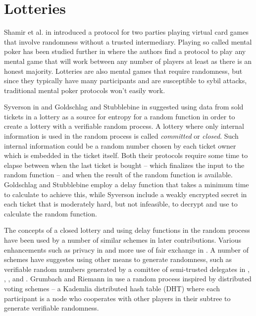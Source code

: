 \section{Lotteries}
\label{sec:lotteries}


Shamir et al. in \cite{shamir_mental_1981} introduced a protocol for two parties playing virtual card games that involve randomness without a trusted intermediary. Playing so called mental poker has been studied further in \cite{goldreich_how_1987} where the authors find a protocol to play any mental game that will work between any number of players at least as there is an honest majority. Lotteries are also mental games that require randomness, but since they typically have many participants and are susceptible to sybil attacks, traditional mental poker protocols won't easily work. 

Syverson in \cite{syverson_weakly_1998} and Goldschlag and Stubblebine in \cite{goldschlag_publicly_1998} suggested using data from sold tickets in a lottery as a source for entropy for a random function in order to create a lottery with a verifiable random process. A lottery where only internal information is used in the random process is called \emph{committed} or \emph{closed}. Such internal information could be a random number chosen by each ticket owner which is embedded in the ticket itself. Both their protocols require some time to elapse between when the last ticket is bought – which finalizes the input to the random function – and when the result of the random function is available. Goldschlag and Stubblebine employ a delay function that takes a minimum time to calculate to achieve this, while Syverson include a weakly encrypted secret in each ticket that is moderately hard, but not infeasible, to decrypt and use to calculate the random function.

The concepts of a closed lottery and using delay functions in the random process have been used by a number of similar schemes in later contributions. Various enhancements such as privacy in \cite{zhou_playing_2001} and more use of fair exchange in \cite{chow_e-lottery_2005}. A number of schemes have suggestes using other means to generate randomness, such as verifiable random numbers generated by a comittee of semi-trusted delegates in \cite{fouque_sharing_2001}, \cite{lee_design_2009}, \cite{liu_improved_2014}, and \cite{xia_information_2019}. Grumbach and Riemann in \cite{grumbach_distributed_2017} use a random process inspired by distributed voting schemes – a Kademlia distributed hash table (DHT) where each participant is a node who cooperates with other players in their subtree to generate verifiable randomness. 


